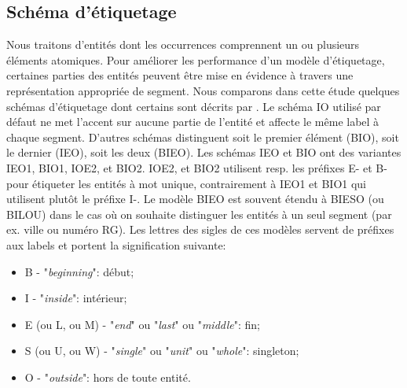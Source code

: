 
\subsection{Schéma d'étiquetage}
Nous traitons d'entités dont les occurrences comprennent un ou plusieurs éléments atomiques. Pour améliorer les performance d'un modèle d'étiquetage, certaines parties des entités peuvent être mise en évidence à travers une représentation appropriée de segment. Nous comparons dans cette étude quelques schémas d'étiquetage dont certains sont décrits par \citet{konkol2015tagModel}. Le schéma IO utilisé par défaut ne met l'accent sur aucune partie de l'entité et affecte le même label à chaque segment. D'autres schémas distinguent soit le premier élément (BIO), soit le dernier (IEO), soit les deux (BIEO). Les schémas IEO et BIO ont des variantes IEO1, BIO1, IOE2, et BIO2. IOE2, et BIO2 utilisent resp. les préfixes E- et B- pour étiqueter les entités à mot unique, contrairement à IEO1 et BIO1 qui utilisent plutôt le préfixe I-. Le modèle BIEO est souvent étendu à BIESO (ou BILOU) dans le cas où on souhaite distinguer les entités à un seul segment (par ex. ville ou numéro RG). Les lettres des sigles de ces modèles servent de préfixes aux labels et portent la signification suivante:

\begin{itemize}
\item B - "\textit{beginning}": début;
\item I - "\textit{inside}": intérieur;
\item E (ou L, ou M) - "\textit{end}" ou "\textit{last}" ou "\textit{middle}": fin;
\item S (ou U, ou W) - "\textit{single}" ou "\textit{unit}" ou "\textit{whole}": singleton;
\item O - "\textit{outside}": hors de toute entité.
\end{itemize}

